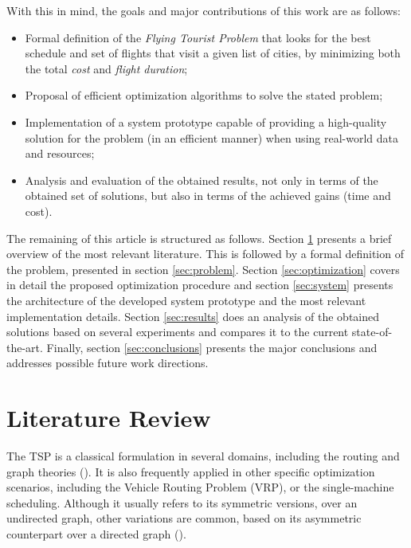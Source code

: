 \documentclass[onecolumn]{elsarticle}
\begin{document}
With this in mind, the goals and major contributions of this work are as follows:
\begin{itemize}
  \item Formal definition of the \textit{Flying Tourist Problem} that looks for the best schedule and set of flights that visit a given list of cities, by minimizing both the total \textit{cost} and \textit{flight duration};
  \item Proposal of efficient optimization algorithms to solve the stated problem;
  \item Implementation of a system prototype capable of providing a high-quality solution for the problem (in an efficient manner) when using real-world data and resources;
  \item Analysis and evaluation of the obtained results, not only in terms of the obtained set of solutions, but also in terms of the achieved gains (time and cost).
\end{itemize}

The remaining of this article is structured as follows. Section \ref{sec:literature} presents a brief overview of the most relevant literature. This is followed by a formal definition of the problem, presented in section \ref{sec:problem}. Section \ref{sec:optimization} covers in detail the proposed optimization procedure and section \ref{sec:system} presents the architecture of the developed system prototype and the most relevant implementation details. Section \ref{sec:results} does an analysis of the obtained solutions based on several experiments and compares it to the current state-of-the-art. Finally, section \ref{sec:conclusions} presents the major conclusions and addresses possible future work directions.

\section{Literature Review}
\label{sec:literature}

The TSP is a classical formulation in several domains, including the routing and graph theories (\cite{tsp_book_computation,graph_theory_book}). It is also frequently applied in other specific optimization scenarios, including the Vehicle Routing Problem (VRP), or the single-machine scheduling. Although it usually refers to its symmetric versions, over an undirected graph,  other variations are common, based on its asymmetric counterpart over a directed graph (\cite{asymmetric}). 
\end{document}
